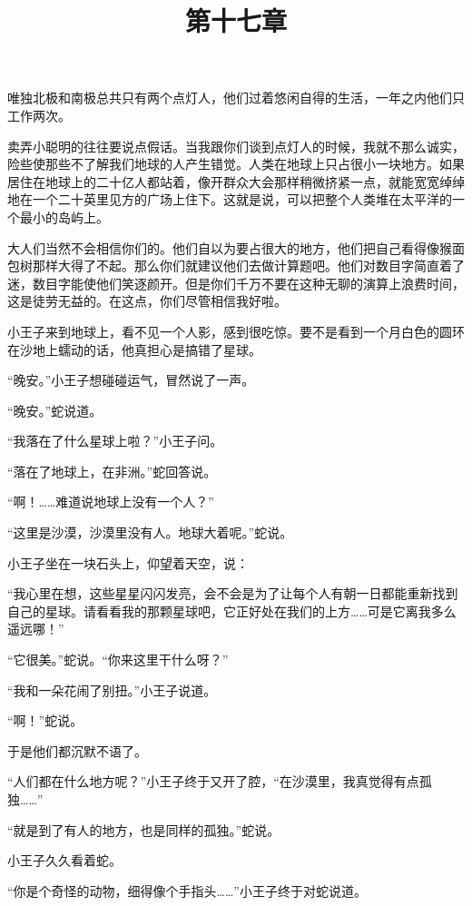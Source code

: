 唯独北极和南极总共只有两个点灯人，他们过着悠闲自得的生活，一年之内他们只工作两次。

\title{第十七章}

卖弄小聪明的往往要说点假话。当我跟你们谈到点灯人的时候，我就不那么诚实，险些使那些不了解我们地球的人产生错觉。人类在地球上只占很小一块地方。如果居住在地球上的二十亿人都站着，像开群众大会那样稍微挤紧一点，就能宽宽绰绰地在一个二十英里见方的广场上住下。这就是说，可以把整个人类堆在太平洋的一个最小的岛屿上。

大人们当然不会相信你们的。他们自以为要占很大的地方，他们把自己看得像猴面包树那样大得了不起。那么你们就建议他们去做计算题吧。他们对数目字简直着了迷，数目字能使他们笑逐颜开。但是你们千万不要在这种无聊的演算上浪费时间，这是徒劳无益的。在这点，你们尽管相信我好啦。

小王子来到地球上，看不见一个人影，感到很吃惊。要不是看到一个月白色的圆环在沙地上蠕动的话，他真担心是搞错了星球。

“晚安。”小王子想碰碰运气，冒然说了一声。

“晚安。”蛇说道。

“我落在了什么星球上啦？”小王子问。

“落在了地球上，在非洲。”蛇回答说。

{\startalignment[center]
 \stopalignment}

“啊！\ldots{}\ldots{}难道说地球上没有一个人？”

“这里是沙漠，沙漠里没有人。地球大着呢。”蛇说。

小王子坐在一块石头上，仰望着天空，说：

“我心里在想，这些星星闪闪发亮，会不会是为了让每个人有朝一日都能重新找到自己的星球。请看看我的那颗星球吧，它正好处在我们的上方\ldots{}\ldots{}可是它离我多么遥远哪！”

“它很美。”蛇说。“你来这里干什么呀？”

“我和一朵花闹了别扭。”小王子说道。

“啊！”蛇说。

于是他们都沉默不语了。

“人们都在什么地方呢？”小王子终于又开了腔，“在沙漠里，我真觉得有点孤独\ldots{}\ldots{}”

“就是到了有人的地方，也是同样的孤独。”蛇说。

小王子久久看着蛇。

“你是个奇怪的动物，细得像个手指头\ldots{}\ldots{}”小王子终于对蛇说道。

{\startalignment[center]
 \stopalignment}

